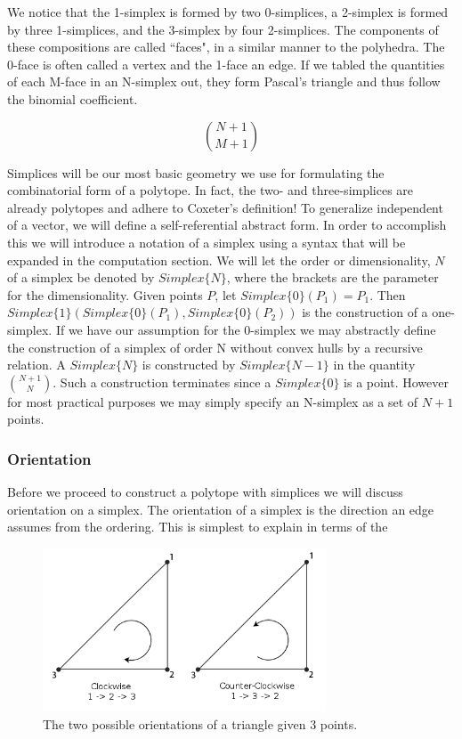 We notice that the 1-simplex is formed by two 0-simplices, a 2-simplex is formed
by three 1-simplices, and the 3-simplex by four 2-simplices. The components of
these compositions are called ``faces", in a similar manner to the polyhedra. The 0-face is often called a vertex
and the 1-face an edge. If we tabled the quantities of each M-face in an
N-simplex out, they form
Pascal's triangle and thus follow the binomial coefficient.

\begin{equation}
{N+1}\choose{M+1}
\end{equation}

Simplices will be our most basic geometry we use for formulating the combinatorial
form of a polytope. In fact, the two- and three-simplices are already
polytopes and adhere to Coxeter's definition! To generalize independent of
a vector, we will define a self-referential abstract form. In order to
accomplish this we will introduce a notation of a simplex using a syntax
that will be expanded in the computation section. We will let the order
or dimensionality, $N$ of
a simplex be denoted by $Simplex\{N\}$, where the brackets are the parameter
for the dimensionality. Given points $P$, let $Simplex\{0\}(P_1) = P_1$.
Then $Simplex\{1\}(Simplex\{0\}(P_1), Simplex\{0\}(P_2))$ is the construction
of a one-simplex. If we have our assumption for the 0-simplex we may
abstractly define the construction of a simplex of order N without convex
hulls by a recursive relation. A $Simplex\{N\}$ is constructed by
$Simplex\{N-1\}$ in the quantity ${N+1}\choose{N}$.
Such a construction terminates since
a $Simplex\{0\}$ is a point. However for most practical purposes
we may simply specify an N-simplex as a set of $N+1$ points.


\subsubsection{Orientation}

Before we proceed to construct a polytope with simplices we will
discuss orientation on a simplex. The orientation of a simplex is the
direction an edge assumes from the ordering. This is simplest to
explain in terms of the 

\begin{figure}[h!]
  \centering
    \includegraphics[width=0.75\textwidth]{img/Winding_order.png}
  \caption{The two possible orientations of a triangle given 3 points.}
  \label{fig:tri_orientation}
\end{figure}



